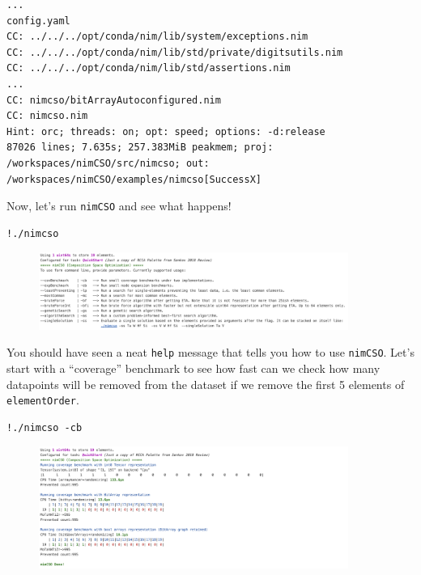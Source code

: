 \begin{verbatim}
...
config.yaml
CC: ../../../opt/conda/nim/lib/system/exceptions.nim
CC: ../../../opt/conda/nim/lib/std/private/digitsutils.nim
CC: ../../../opt/conda/nim/lib/std/assertions.nim
...
CC: nimcso/bitArrayAutoconfigured.nim
CC: nimcso.nim
Hint: orc; threads: on; opt: speed; options: -d:release
87026 lines; 7.635s; 257.383MiB peakmem; proj: /workspaces/nimCSO/src/nimcso; out: /workspaces/nimCSO/examples/nimcso[SuccessX]
\end{verbatim}

Now, let's run \texttt{nimCSO} and see what happens!

\begin{verbatim}
!./nimcso
\end{verbatim}

\begin{figure}[H]
  \centering
  \includegraphics[width=0.9\textwidth]{nimcsotutorial/1.png}
\end{figure}

You should have seen a neat \texttt{help} message that
tells you how to use \texttt{nimCSO}. Let's start with
a ``coverage'' benchmark to see how fast can we check how many
datapoints will be removed from the dataset if we remove the first 5
elements of \texttt{elementOrder}.

\begin{verbatim}
!./nimcso -cb
\end{verbatim}

\begin{figure}[H]
  \centering
  \includegraphics[width=0.9\textwidth]{nimcsotutorial/2.png}
\end{figure}

